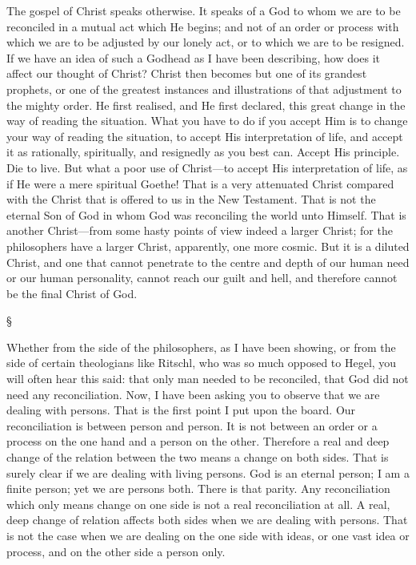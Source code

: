\documentclass[12pt,letterpaper,oneside]{book}
\begin{document}
The gospel of Christ speaks otherwise. It 
speaks of a God to whom we are to be reconciled 
in a mutual act which He begins; and not of 
an order or process with which we are to be 
adjusted by our lonely act, or to which we are 
to be resigned. If we have an idea of such a 
Godhead as I have been describing, how does 
it affect our thought of Christ? Christ then 
becomes but one of its grandest prophets, or 
one of the greatest instances and illustrations of 
that adjustment to the mighty order. He first 
realised, and He first declared, this great change 
in the way of reading the situation. What you 
have to do if you accept Him is to change your 
way of reading the situation, to accept His 
interpretation of life, and accept it as rationally, 
spiritually, and resignedly as you best can. 
Accept His principle. Die to live. But what a 
poor use of Christ---to accept His interpretation 
of life, as if He were a mere spiritual Goethe! 
That is a very attenuated Christ compared with 
the Christ that is offered to us in the New 
Testament. That is not the eternal Son of God 
in whom God was reconciling the world unto 
Himself. That is another Christ---from some 
hasty points of view indeed a larger Christ; 
for the philosophers have a larger Christ, apparently,
one more cosmic. But it is a diluted 
Christ, and one that cannot penetrate to the 
centre and depth of our human need or our 
human personality, cannot reach our guilt and 
hell, and therefore cannot be the final Christ 
of God. 

\begin{center}
\S
\end{center}

Whether from the side of the philosophers, as 
I have been showing, or from the side of certain 
theologians like Ritschl, who was so much 
opposed to Hegel, you will often hear this 
said: that only man needed to be reconciled, 
that God did not need any reconciliation. 
Now, I have been asking you to observe that 
we are dealing with persons. That is the first 
point I put upon the board. Our reconciliation 
is between person and person. It is not 
between an order or a process on the one hand 
and a person on the other. Therefore a real 
and deep change of the relation between the 
two means a change on both sides. That is 
surely clear if we are dealing with living persons. 
God is an eternal person; I am a finite 
person; yet we are persons both. There is that 
parity. Any reconciliation which only means 
change on one side is not a real reconciliation 
at all. A real, deep change of relation affects 
both sides when we are dealing with persons. 
That is not the case when we are dealing on 
the one side with ideas, or one vast idea 
or process, and on the other side a person 
only. 
\end{document}

